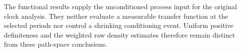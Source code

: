The functional results supply the unconditioned process input for the
original clock analysis. They neither evaluate a measurable transfer
function at the selected periods nor control a shrinking conditioning
event. Uniform positive definiteness and the weighted raw density
estimates therefore remain distinct from these path-space conclusions.
